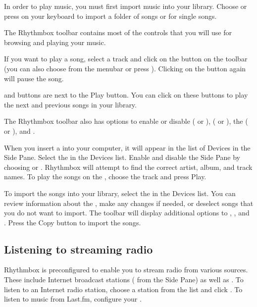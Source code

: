 In order to play music, you must first import music into your library. Choose  or press  on your keyboard to import a folder of songs or  for single songs.

The Rhythmbox toolbar contains most of the controls that you will use for browsing and playing your music.

If you want to play a song, select a track and click on the  button on the toolbar (you can also choose  from the menubar or press ). Clicking on the  button again will pause the song.

 and  buttons are next to the Play button. You can click on these buttons to play the next and previous songs in your library.

The Rhythmbox toolbar also has options to enable or disable  ( or ),  ( or ), the  ( or ), and .

When you insert a  into your computer, it will appear in the list of Devices in the Side Pane. Select the  in the Devices list. Enable and disable the Side Pane by choosing  or . Rhythmbox will attempt to find the correct artist, album, and track names. To play the songs on the , choose the track and press Play.

To import the songs into your library, select the  in the Devices list. You can review information about the , make any changes if needed, or deselect songs that you do not want to import. The toolbar will display additional options to , , and . Press the Copy button to import the songs.

\subsection{Listening to streaming radio}

Rhythmbox is preconfigured to enable you to stream radio from various sources. These include Internet broadcast stations ( from the Side Pane) as well as . To listen to an Internet radio station, choose a station from the list and click . To listen to music from Last.fm, configure your .

